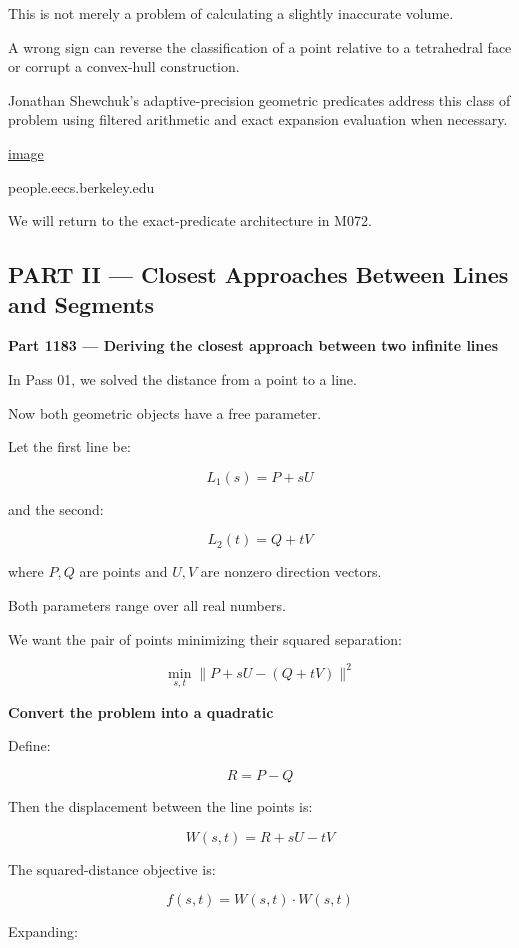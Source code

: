 This is not merely a problem of calculating a slightly inaccurate volume.

A wrong sign can reverse the classification of a point relative to a tetrahedral face or corrupt a convex-hull construction.

Jonathan Shewchuk's adaptive-precision geometric predicates address this class of problem using filtered arithmetic and exact expansion evaluation when necessary. 

\href{https://www.google.com/s2/favicons?domain=https://people.eecs.berkeley.edu&sz=32}{image}

people.eecs.berkeley.edu

We will return to the exact-predicate architecture in M072.

\subsection{PART II --- Closest Approaches Between Lines and Segments}\label{04-visual-computing-ii-ch022-part-ii-closest-approaches-between-lines-and-segments}

\textbf{Part 1183 --- Deriving the closest approach between two infinite lines}

In Pass 01, we solved the distance from a point to a line.

Now both geometric objects have a free parameter.

Let the first line be:

\[
L_1(s)=P+sU
\]

and the second:

\[
L_2(t)=Q+tV
\]

where \(P,Q\) are points and \(U,V\) are nonzero direction vectors.

Both parameters range over all real numbers.

We want the pair of points minimizing their squared separation:

\[
\boxed{ \min_{s,t}\|P+sU-(Q+tV)\|^2 }
\]

\textbf{Convert the problem into a quadratic}

Define:

\[
R=P-Q
\]

Then the displacement between the line points is:

\[
W(s,t)=R+sU-tV
\]

The squared-distance objective is:

\[
f(s,t)=W(s,t)\cdot W(s,t)
\]

Expanding:


